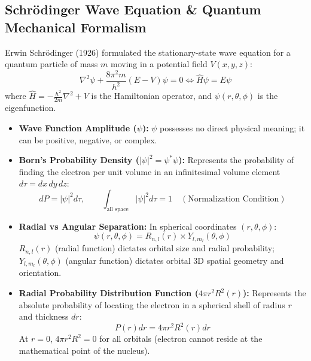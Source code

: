\documentclass[10pt,a4paper]{article}
\begin{document}
\subsection{Schrödinger Wave Equation \& Quantum Mechanical Formalism}
Erwin Schrödinger (1926) formulated the stationary-state wave equation for a quantum particle of mass $m$ moving in a potential field $V(x,y,z)$:
\begin{equation}
  \nabla^2 \psi + \frac{8\pi^2 m}{h^2}(E - V)\psi = 0 \iff \hat{H}\psi = E\psi
\end{equation}
where $\hat{H} = -\frac{\hbar^2}{2m}\nabla^2 + V$ is the Hamiltonian operator, and $\psi(r, \theta, \phi)$ is the eigenfunction.

\begin{conceptbox}
\begin{itemize}
  \item \textbf{Wave Function Amplitude ($\psi$):} $\psi$ possesses no direct physical meaning; it can be positive, negative, or complex.
  \item \textbf{Born's Probability Density ($|\psi|^2 = \psi^* \psi$):} Represents the probability of finding the electron per unit volume in an infinitesimal volume element $d\tau = dx\,dy\,dz$:
  \begin{equation}
    dP = |\psi|^2 d\tau, \qquad \int_{\text{all space}} |\psi|^2 d\tau = 1 \quad (\text{Normalization Condition})
  \end{equation}
  \item \textbf{Radial vs Angular Separation:} In spherical coordinates $(r, \theta, \phi)$:
  \begin{equation}
    \psi(r, \theta, \phi) = R_{n,l}(r) \times Y_{l,m_l}(\theta, \phi)
  \end{equation}
  $R_{n,l}(r)$ (radial function) dictates orbital size and radial probability; $Y_{l,m_l}(\theta, \phi)$ (angular function) dictates orbital 3D spatial geometry and orientation.
  \item \textbf{Radial Probability Distribution Function ($4\pi r^2 R^2(r)$):} Represents the absolute probability of locating the electron in a spherical shell of radius $r$ and thickness $dr$:
  \begin{equation}
    P(r)dr = 4\pi r^2 R^2(r) dr
  \end{equation}
  At $r = 0$, $4\pi r^2 R^2 = 0$ for all orbitals (electron cannot reside at the mathematical point of the nucleus).
\end{itemize}
\end{conceptbox}
\end{document}
